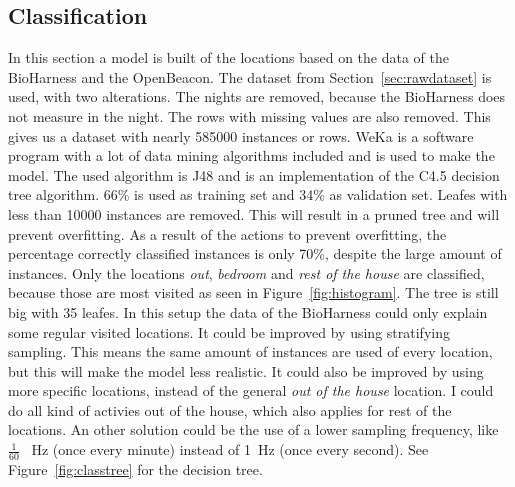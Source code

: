 	\subsection{Classification}
	\label{sec:classification}
	In this section a model is built of the locations based on the data of the BioHarness and the OpenBeacon. The dataset from Section~\ref{sec:rawdataset}  is used, with two alterations. The nights are removed, because the BioHarness does not measure in the night. The rows with missing values are also removed. This gives us a dataset with nearly 585000 instances or rows. WeKa \cite{weka} is a software program with a lot of data mining algorithms included and is used to make the model. The used algorithm is J48 and is an implementation of the C4.5 \cite{quinlan1993c4} decision tree algorithm. 66\% is used as training set and 34\% as validation set. Leafes with less than 10000 instances are removed. This will result in a pruned tree and will prevent overfitting. As a result of the actions to prevent overfitting, the percentage correctly classified instances is only 70\%, despite the large amount of instances. Only the locations \emph{out}, \emph{bedroom} and \emph{rest of the house} are classified, because those are most visited as seen in Figure~\ref{fig:histogram}. The tree is still big with 35 leafes. In this setup the data of the BioHarness could only explain some regular visited locations. It could be improved by using stratifying sampling. This means the same amount of instances are used of every location, but this will make the model less realistic. It could also be improved by using more specific locations, instead of the general \emph{out of the house} location. I could do all kind of activies out of the house, which also applies for rest of the locations. An other solution could be the use of a lower sampling frequency, like $\frac{1}{60}$ \SI{}{\hertz} (once every minute) instead of \SI{1}{\hertz} (once every second). See Figure~\ref{fig:classtree} for the decision tree. \\

